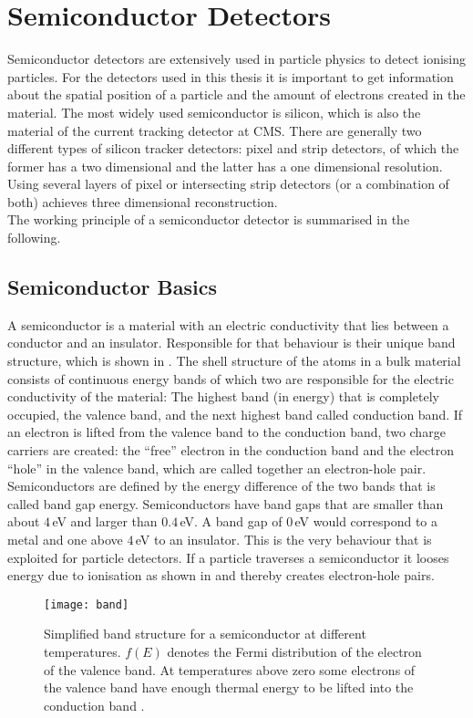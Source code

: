 \section{Semiconductor Detectors}
Semiconductor detectors are extensively used in particle physics to detect ionising particles. For the detectors used in this thesis it is important to get information about the spatial position of a particle and the amount of electrons created in the material. The most widely used semiconductor is silicon, which is also the material of the current tracking detector at \ac{CMS}. There are generally two different types of silicon tracker detectors: pixel and strip detectors, of which the former has a two dimensional and the latter has a one dimensional resolution. Using several layers of pixel or intersecting strip detectors (or a combination of both) achieves three dimensional reconstruction.\\
The working principle of a semiconductor detector is summarised in the following.
\subsection{Semiconductor Basics}
A semiconductor is a material with an electric conductivity that lies between a conductor and an insulator. Responsible for that behaviour is their unique band structure, which is shown in . The shell structure of the atoms in a bulk material consists of continuous energy bands of which two are responsible for the electric conductivity of the material: The highest band (in energy) that is completely occupied, the valence band, and the next highest band called conduction band. If an electron is lifted from the valence band to the conduction band, two charge carriers are created: the ``free'' electron in the conduction band and the electron ``hole'' in the valence band, which are called together an electron-hole pair.\\
Semiconductors are defined by the energy difference of the two bands that is called band gap energy. Semiconductors have band gaps that are smaller than about $4\,$eV and larger than $0.4\,$eV. A band gap of $0\,$eV would correspond to a metal and one above $4\,$eV to an insulator. This is the very behaviour that is exploited for particle detectors. If a particle traverses a semiconductor it looses energy due to ionisation as shown in  and thereby creates electron-hole pairs.
\begin{figure}[ht]
	\centering
	\texttt{[image: band]}
	\caption{Simplified band structure for a semiconductor at different temperatures. $f(E)$ denotes the Fermi distribution of the electron of the valence band. At temperatures above zero some electrons of the valence band have enough thermal energy to be lifted into the conduction band \cite{hyperphys}.}
	\label{pband}
\end{figure}\no
